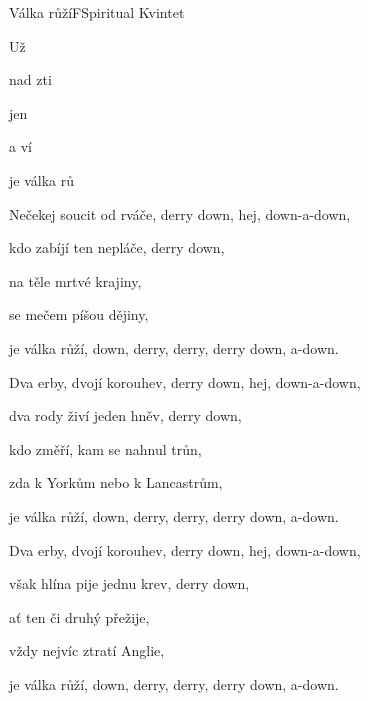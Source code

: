\setcounter{page}{96}
\begin{song}{Válka růží}{F}{Spiritual Kvintet}
\begin{SBVerse}
Už  

nad zti 

jen 

a ví

je válka rů 
\end{SBVerse}
\begin{SBVerse}
Nečekej soucit od rváče, derry down, hej, down-a-down,

kdo zabíjí ten nepláče, derry down,

na těle mrtvé krajiny,

se mečem píšou dějiny,

je válka růží, down, derry, derry, derry down, a-down.
\end{SBVerse}
\begin{SBVerse}
Dva erby, dvojí korouhev, derry down, hej, down-a-down,

dva rody živí jeden hněv, derry down,

kdo změří, kam se nahnul trůn, 

zda k Yorkům nebo k Lancastrům,

je válka růží, down, derry, derry, derry down, a-down.
\end{SBVerse}
\begin{SBVerse}
Dva erby, dvojí korouhev, derry down, hej, down-a-down,

však hlína pije jednu krev, derry down,

ať ten či druhý přežije, 

vždy nejvíc ztratí Anglie,

je válka růží, down, derry, derry, derry down, a-down.
\end{SBVerse}
\end{song}

\pagebreak
